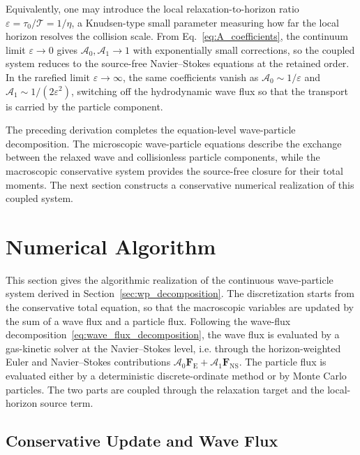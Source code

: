 \documentclass[preprint,12pt]{elsarticle}
\begin{document}
Equivalently, one may introduce the local relaxation-to-horizon ratio $\varepsilon=\tau_0/\mathcal{T}=1/\eta$, a Knudsen-type small parameter measuring how far the local horizon resolves the collision scale. From Eq.~\eqref{eq:A_coefficients}, the continuum limit $\varepsilon\to0$ gives $\mathcal A_0,\mathcal A_1\to1$ with exponentially small corrections, so the coupled system reduces to the source-free Navier--Stokes equations at the retained order. In the rarefied limit $\varepsilon\to\infty$, the same coefficients vanish as $\mathcal A_0\sim1/\varepsilon$ and $\mathcal A_1\sim1/(2\varepsilon^2)$, switching off the hydrodynamic wave flux so that the transport is carried by the particle component.

The preceding derivation completes the equation-level wave-particle decomposition. The microscopic wave-particle equations describe the exchange between the relaxed wave and collisionless particle components, while the macroscopic conservative system provides the source-free closure for their total moments. The next section constructs a conservative numerical realization of this coupled system.

\section{Numerical Algorithm}\label{sec:coupled_scheme}

This section gives the algorithmic realization of the continuous wave-particle system derived in Section~\ref{sec:wp_decomposition}. The discretization starts from the conservative total equation, so that the macroscopic variables are updated by the sum of a wave flux and a particle flux. Following the wave-flux decomposition~\eqref{eq:wave_flux_decomposition}, the wave flux is evaluated by a gas-kinetic solver at the Navier--Stokes level, i.e. through the horizon-weighted Euler and Navier--Stokes contributions $\mathcal A_0\mathbf F_{\mathrm E}+\mathcal A_1\mathbf F_{\mathrm{NS}}$. The particle flux is evaluated either by a deterministic discrete-ordinate method or by Monte Carlo particles. The two parts are coupled through the relaxation target and the local-horizon source term.

\subsection{Conservative Update and Wave Flux}\label{sec:algorithm_wave_flux}
\end{document}
